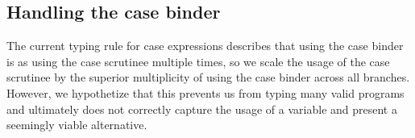 \documentclass[]{lwnovathesis}
\begin{document}






\subsection{Handling the case binder\label{casebinder}}

The current typing rule for case expressions describes that using the case
binder is as using the case scrutinee multiple times, so we scale the usage of
the case scrutinee by the superior multiplicity of using the case binder across
all branches. However, we hypothetize that this prevents us from typing many
valid programs and ultimately does not correctly capture the usage of a
variable and present a seemingly viable alternative.
\end{document}
